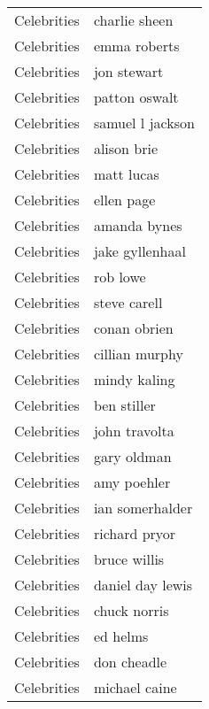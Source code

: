 \begin{supertabular}{l p{0.25\textwidth}}
      Celebrities &                      charlie sheen \\
      Celebrities &                       emma roberts \\
      Celebrities &                        jon stewart \\
      Celebrities &                      patton oswalt \\
      Celebrities &                   samuel l jackson \\
      Celebrities &                        alison brie \\
      Celebrities &                         matt lucas \\
      Celebrities &                         ellen page \\
      Celebrities &                       amanda bynes \\
      Celebrities &                    jake gyllenhaal \\
      Celebrities &                           rob lowe \\
      Celebrities &                       steve carell \\
      Celebrities &                       conan obrien \\
      Celebrities &                     cillian murphy \\
      Celebrities &                       mindy kaling \\
      Celebrities &                        ben stiller \\
      Celebrities &                      john travolta \\
      Celebrities &                        gary oldman \\
      Celebrities &                        amy poehler \\
      Celebrities &                    ian somerhalder \\
      Celebrities &                      richard pryor \\
      Celebrities &                       bruce willis \\
      Celebrities &                   daniel day lewis \\
      Celebrities &                       chuck norris \\
      Celebrities &                           ed helms \\
      Celebrities &                        don cheadle \\
      Celebrities &                      michael caine \\

\end{supertabular}
